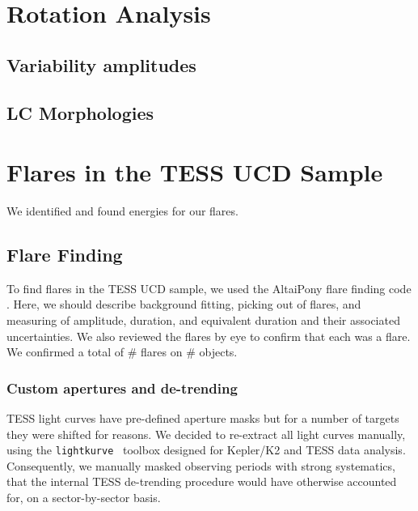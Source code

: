 \documentclass[twocolumn]{aastex62}
\begin{document}
\section{Rotation Analysis} \label{sec:rot}
\subsection{Variability amplitudes} \label{subsec:varamp}
\subsection{LC Morphologies} \label{subsec:LCmorph}

\section{Flares in the TESS UCD Sample} \label{sec:Flares}
We identified and found energies for our flares. 

\subsection{Flare Finding}
\label{subsec:findflare}
To find flares in the TESS UCD sample, we used the AltaiPony flare finding code \citep[][in prep.]{Ilin2019,Ilin2020}. Here, we should describe background fitting, picking out of flares, and measuring of amplitude, duration, and equivalent duration and their associated uncertainties. We also reviewed the flares by eye to confirm that each was a flare. We confirmed a total of \# flares on \# objects. 
\subsubsection{Custom apertures and de-trending}
TESS light curves have pre-defined aperture masks but for a number of targets they were shifted for reasons. We decided to re-extract all light curves manually, using the \texttt{lightkurve}~\citep{lightkurve2019} toolbox designed for Kepler/K2 and TESS data analysis. Consequently, we manually masked observing periods with strong systematics, that the internal TESS de-trending procedure would have otherwise accounted for, on a sector-by-sector basis.
\end{document}
